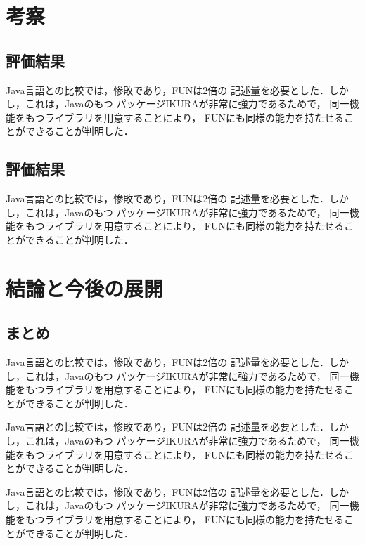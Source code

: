 \documentclass{funthesis}
\begin{document}
\chapter{考察}

\section{評価結果}

Java言語との比較では，惨敗であり，FUNは2倍の
記述量を必要とした．しかし，これは，Javaのもつ
パッケージIKURAが非常に強力であるためで，
同一機能をもつライブラリを用意することにより，
FUNにも同様の能力を持たせることができることが判明した．

\section{評価結果}

Java言語との比較では，惨敗であり，FUNは2倍の
記述量を必要とした．しかし，これは，Javaのもつ
パッケージIKURAが非常に強力であるためで，
同一機能をもつライブラリを用意することにより，
FUNにも同様の能力を持たせることができることが判明した．


\chapter{結論と今後の展開}

\section{まとめ}

Java言語との比較では，惨敗であり，FUNは2倍の
記述量を必要とした．しかし，これは，Javaのもつ
パッケージIKURAが非常に強力であるためで，
同一機能をもつライブラリを用意することにより，
FUNにも同様の能力を持たせることができることが判明した．

Java言語との比較では，惨敗であり，FUNは2倍の
記述量を必要とした．しかし，これは，Javaのもつ
パッケージIKURAが非常に強力であるためで，
同一機能をもつライブラリを用意することにより，
FUNにも同様の能力を持たせることができることが判明した．

Java言語との比較では，惨敗であり，FUNは2倍の
記述量を必要とした．しかし，これは，Javaのもつ
パッケージIKURAが非常に強力であるためで，
同一機能をもつライブラリを用意することにより，
FUNにも同様の能力を持たせることができることが判明した．
\end{document}
